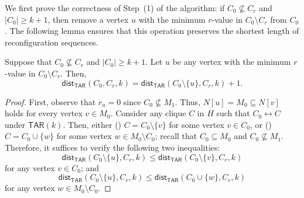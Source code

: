 \documentclass{llncs}
\newcommand{\onestep}{\leftrightarrow}
\newcommand{\TAR}[1]{\mathsf{TAR}(#1)}
\newcommand{\ini}{0}
\newcommand{\tar}{r}
\newcommand{\cliq}{C}
\newcommand{\distTAR}[3]{\mathsf{dist_{TAR}}(#1,#2,#3)}
\newcommand{\subH}{H}
\newcommand{\intH}{\subH}
\newcounter{one}
\newcommand{\one}{{\rm \roman{one}}}
\newcounter{two}
\newcommand{\two}{{\rm \roman{two}}}
\begin{document}
	We first prove the correctness of Step~(1) of the algorithm:
if $\cliq_{\ini} \not\subseteq \cliq_{\tar}$ and $|\cliq_{\ini}| \ge k+1$, then remove a vertex $u$ with the minimum $r$-value in $\cliq_{\ini} \setminus \cliq_{\tar}$ from $\cliq_{\ini}$.
The following lemma ensures that this operation preserves the shortest length of reconfiguration sequences.
	\begin{lemma} \label{lem:greedily-removing-a-shortest-interval}
	Suppose that $\cliq_{\ini} \not\subseteq \cliq_{\tar}$ and $|\cliq_{\ini}| \ge k+1$.
	Let $u$ be any vertex with the minimum $r$-value in $\cliq_{\ini} \setminus \cliq_{\tar}$.
	Then, 
	\[
		\distTAR{\cliq_{\ini}}{\cliq_{\tar}}{k} = \distTAR{\cliq_{\ini} \setminus \{u\}}{\cliq_{\tar}}{k} + 1.
	\]
	\end{lemma}
	\begin{proof}
	First, observe that $r_{u} = 0$ since $\cliq_{\ini} \not\subseteq M_{1}$.
	Thus, $N[u] = M_0 \subseteq N[v]$ holds for every vertex $v \in M_{0}$.
	Consider any clique $\cliq$ in $\intH$ such that $\cliq_{\ini} \onestep \cliq$ under $\TAR{k}$.
	Then, either (\one) $\cliq = \cliq_{\ini} \setminus \{ v\}$ for some vertex $v \in \cliq_{\ini}$, or (\two) $\cliq = \cliq_{\ini} \cup \{w\}$ for some vertex $w \in M_0 \setminus \cliq_{\ini}$;
recall that $\cliq_{\ini} \subseteq M_0$ and $\cliq_{\ini} \not\subseteq M_{1}$. 
	Therefore, it suffices to verify the following two inequalities:
	\begin{equation} \label{eq:delete}
		\distTAR{\cliq_{\ini} \setminus \{u\}}{\cliq_{\tar}}{k} \le \distTAR{\cliq_{\ini} \setminus \{v\}}{\cliq_{\tar}}{k}
	\end{equation}
for any vertex $v \in \cliq_{\ini}$; and 
	\begin{equation} \label{eq:add}
		\distTAR{\cliq_{\ini} \setminus \{u\}}{\cliq_{\tar}}{k} \le \distTAR{\cliq_{\ini} \cup \{w\}}{\cliq_{\tar}}{k}
	\end{equation}
for any vertex $w \in M_{0} \setminus \cliq_{\ini}$.
\medskip


\end{proof}
\end{document}

